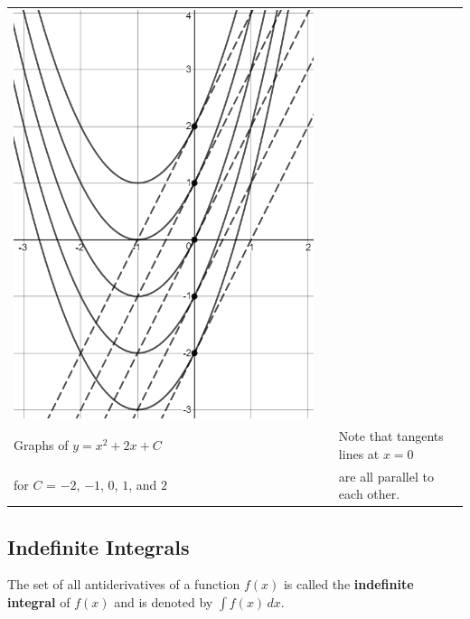 \documentclass[12pt,letterpaper]{article}
\begin{document}
\begin{center}
\begin{tabular}{lcl}
\includegraphics[scale=0.5]{math180_sec5_4_img2.png} \\
Graphs of $y = x^2 + 2x + C$ & & Note that tangents lines at $x = 0$ \\
for $C$ = $-2$, $-1$, $0$, $1$, and $2$ & & are all parallel to each other.
\end{tabular}
\end{center}


\subsection*{Indefinite Integrals}




\begin{tcolorbox}

The set of all antiderivatives of a function $f(x)$ is called the \textbf{indefinite integral} of $f(x)$ and is denoted by $\int f(x) \, dx$.

\end{tcolorbox}
\end{document}
